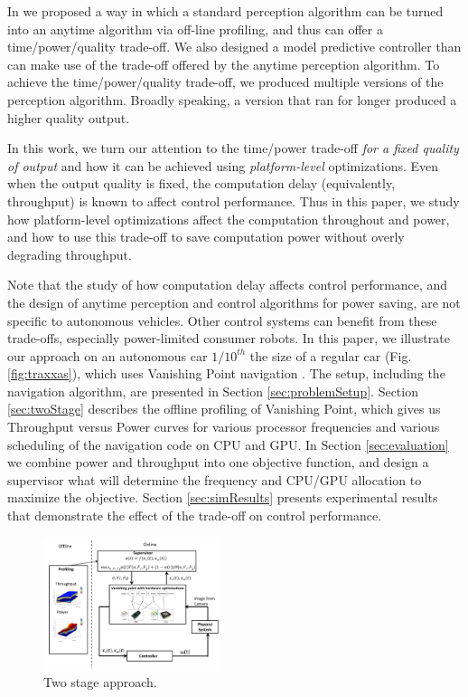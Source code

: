 In \cite{RTSS15} we proposed a way in which a standard perception algorithm can be turned into an anytime algorithm via off-line profiling, and thus can offer a time/power/quality trade-off.
We also designed a model predictive controller than can make use of the trade-off offered by the anytime perception algorithm.
To achieve the time/power/quality trade-off, we produced multiple versions of the perception algorithm.
Broadly speaking, a version that ran for longer produced a higher quality output. 

In this work, we turn our attention to the time/power trade-off \emph{for a fixed quality of output} and how it can be achieved using \emph{platform-level} optimizations.
Even when the output quality is fixed, the computation delay (equivalently, throughput) is known to affect control performance. 
Thus in this paper, we study how platform-level optimizations affect the computation throughout and power, and how to use this trade-off to save computation power without overly degrading throughput.

Note that the study of how computation delay affects control performance, and the design of anytime perception and control algorithms for power saving, are not specific to autonomous vehicles.
Other control systems can benefit from these trade-offs, especially power-limited consumer robots.
In this paper, we illustrate our approach on an autonomous car $1/10^{th}$ the size of a regular car (Fig. \ref{fig:traxxas}), which uses Vanishing Point navigation \cite{VP1}. 
The setup, including the navigation algorithm, are presented in Section \ref{sec:problemSetup}.
Section \ref{sec:twoStage} describes the offline profiling of Vanishing Point, which gives us Throughput versus Power curves for various processor frequencies and various scheduling of the navigation code on CPU and GPU.
In Section \ref{sec:evaluation} we combine power and throughput into one objective function, and design a supervisor what will determine the frequency and CPU/GPU allocation to maximize the objective.
Section \ref{sec:simResults} presents experimental results that demonstrate the effect of the trade-off on control performance.
\begin{figure}[t]
	\centering
	\includegraphics[width=0.46\textwidth]{Figs/bigFig.pdf}
	\vspace{-10pt}
	\caption{Two stage approach.}
	\label{fig:juicyj}%
\end{figure} 

